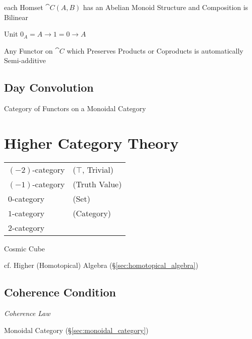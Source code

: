 each Homset $\cat{C}(A,B)$ has an Abelian Monoid Structure and
Composition is Bilinear

Unit $0_A = A \rightarrow 1 = 0 \rightarrow A$

Any Functor on $\cat{C}$ which Preserves Products or Coproducts is
automatically Semi-additive



\subsection{Day Convolution}\label{sec:day_convolution}


Category of Functors on a Monoidal Category



\section{Higher Category Theory}\label{sec:higher_category}

\begin{tabular}{l l}
  $(-2)$-category   & ($\top$, Trivial) \\
  $(-1)$-category   & (Truth Value) \\
  $0$-category      & (Set) \\
  $1$-category      & (Category) \\
  $2$-category      & \\
\end{tabular}

Cosmic Cube %

cf. Higher (Homotopical) Algebra (\S\ref{sec:homotopical_algebra})



\subsection{Coherence Condition}\label{sec:coherence_condition}

\emph{Coherence Law}

Monoidal Category (\S\ref{sec:monoidal_category})

